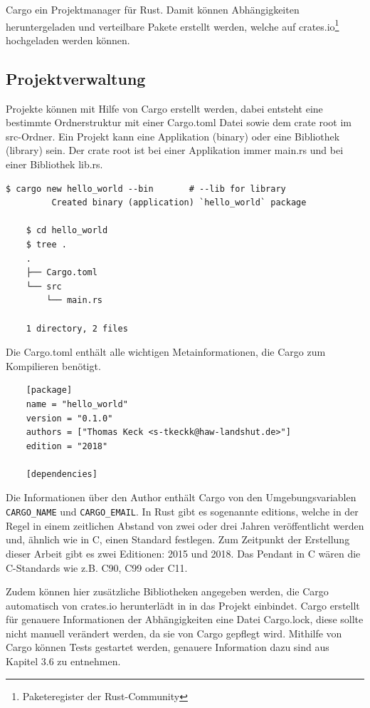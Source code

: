 Cargo ein Projektmanager für Rust. Damit können Abhängigkeiten heruntergeladen und verteilbare Pakete erstellt werden, welche auf crates.io\footnote{Paketeregister der Rust-Community} hochgeladen werden können. \cite{CargoBook}

\subsection{Projektverwaltung}

Projekte können mit Hilfe von Cargo erstellt werden, dabei entsteht eine bestimmte Ordnerstruktur mit einer Cargo.toml Datei sowie dem crate root im src-Ordner. Ein Projekt kann eine Applikation (binary) oder eine Bibliothek (library) sein. Der crate root ist bei einer Applikation immer \glqq main.rs\grqq{} und bei einer Bibliothek \glqq lib.rs\grqq{}.

\begin{lstlisting}[style=tree]
    $ cargo new hello_world --bin       # --lib for library
         Created binary (application) `hello_world` package

    $ cd hello_world
    $ tree .
    .
    ├── Cargo.toml
    └── src
        └── main.rs
    
    1 directory, 2 files
\end{lstlisting}

Die Cargo.toml enthält alle wichtigen Metainformationen, die Cargo zum Kompilieren benötigt. 

\begin{lstlisting}
    [package]
    name = "hello_world"
    version = "0.1.0"
    authors = ["Thomas Keck <s-tkeckk@haw-landshut.de>"]
    edition = "2018"
    
    [dependencies]    
\end{lstlisting}

Die Informationen über den Author enthält Cargo von den Umgebungsvariablen \verb"CARGO_NAME" und \verb"CARGO_EMAIL". In Rust gibt es sogenannte editions, welche in der Regel in einem zeitlichen Abstand von zwei oder drei Jahren veröffentlicht werden und, ähnlich wie in C, einen Standard festlegen. Zum Zeitpunkt der Erstellung dieser Arbeit gibt es zwei Editionen: 2015 und 2018. Das Pendant in C wären die C-Standards wie z.B. C90, C99 oder C11.

Zudem können hier zusätzliche Bibliotheken angegeben werden, die Cargo automatisch von crates.io herunterlädt in in das Projekt einbindet. Cargo erstellt für genauere Informationen der Abhängigkeiten eine Datei Cargo.lock, diese sollte nicht manuell verändert werden, da sie von Cargo gepflegt wird. Mithilfe von Cargo können Tests gestartet werden, genauere Information dazu sind aus Kapitel 3.6 zu entnehmen.

